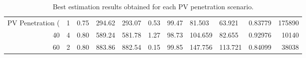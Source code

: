 \begin{table}
\caption{Best estimation results obtained for each PV penetration scenario.}
\label{tab:best_results}
\begin{tabular}{rrllllllllr}
\toprule
PV Penetration (%
\midrule
20 & 1 & 0.75 & 294.62 & 293.07 & 0.53 & 99.47 & 81.503 & 63.921 & 0.83779 & 175890 \\
40 & 4 & 0.80 & 589.24 & 581.78 & 1.27 & 98.73 & 104.659 & 82.655 & 0.92976 & 10140 \\
60 & 2 & 0.80 & 883.86 & 882.54 & 0.15 & 99.85 & 147.756 & 113.721 & 0.84099 & 38038 \\
\bottomrule
\end{tabular}
\end{table}

